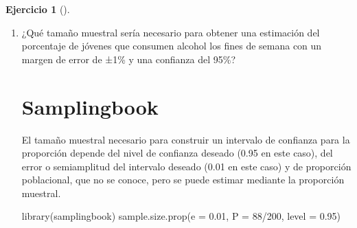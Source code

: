 \documentclass[
  a4paper,
]{scrreport}
\newenvironment{Shaded}{\begin{snugshade}}{\end{snugshade}}
\newcommand{\AttributeTok}[1]{\textcolor[rgb]{0.40,0.45,0.13}{#1}}
\newcommand{\DecValTok}[1]{\textcolor[rgb]{0.68,0.00,0.00}{#1}}
\newcommand{\ExtensionTok}[1]{\textcolor[rgb]{0.00,0.23,0.31}{#1}}
\newcommand{\FloatTok}[1]{\textcolor[rgb]{0.68,0.00,0.00}{#1}}
\newcommand{\FunctionTok}[1]{\textcolor[rgb]{0.28,0.35,0.67}{#1}}
\newcommand{\NormalTok}[1]{\textcolor[rgb]{0.00,0.23,0.31}{#1}}
\newcommand{\SpecialCharTok}[1]{\textcolor[rgb]{0.37,0.37,0.37}{#1}}
\theoremstyle{definition}
\newtheorem{exercise}{Ejercicio}[chapter]
\theoremstyle{remark}
\begin{document}
\begin{exercise}[]
\begin{enumerate}
\begin{tcolorbox}
  \section{Copilot}

\begin{Shaded}
\begin{Highlighting}[]
\ExtensionTok{Calcular}\NormalTok{ el intervalo de confianza del 95\% para la proporción de jóvenes de 18 años que consumen alcohol los fines de semana, a partir de una muestra de 200 jóvenes, de los cuales 88 consumen alcohol los fines de semana.}
\end{Highlighting}
\end{Shaded}

  El margen de error del intervalo es de aproximadamente un ±7\%, por lo
  que se trata de un intervalo poco preciso.

  \end{tcolorbox}
\item
  ¿Qué tamaño muestral sería necesario para obtener una estimación del
  porcentaje de jóvenes que consumen alcohol los fines de semana con un
  margen de error de ±1\% y una confianza del 95\%?

  \begin{tcolorbox}[enhanced jigsaw, colframe=quarto-callout-tip-color-frame, toprule=.15mm, bottomtitle=1mm, breakable, opacitybacktitle=0.6, toptitle=1mm, colback=white, bottomrule=.15mm, title=\textcolor{quarto-callout-tip-color}{\faLightbulb}\hspace{0.5em}{Solución}, arc=.35mm, left=2mm, titlerule=0mm, rightrule=.15mm, coltitle=black, leftrule=.75mm, opacityback=0, colbacktitle=quarto-callout-tip-color!10!white]

  \section{Samplingbook}

  El tamaño muestral necesario para construir un intervalo de confianza
  para la proporción depende del nivel de confianza deseado (0.95 en
  este caso), del error o semiamplitud del intervalo deseado (0.01 en
  este caso) y de proporción poblacional, que no se conoce, pero se
  puede estimar mediante la proporción muestral.

\begin{Shaded}
\begin{Highlighting}[]
\FunctionTok{library}\NormalTok{(samplingbook)}
\FunctionTok{sample.size.prop}\NormalTok{(}\AttributeTok{e =} \FloatTok{0.01}\NormalTok{, }\AttributeTok{P =} \DecValTok{88}\SpecialCharTok{/}\DecValTok{200}\NormalTok{, }\AttributeTok{level =} \FloatTok{0.95}\NormalTok{)}
\end{Highlighting}
\end{Shaded}


\end{tcolorbox}
\end{enumerate}
\end{exercise}
\end{document}
